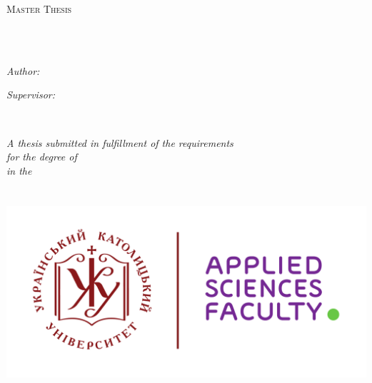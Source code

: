 \documentclass[
    11pt,
    english,
    singlespacing,
    headsepline,
    openany,
]{MastersThesis}
\author{Oleksandr \textsc{Onbysh}}
\begin{document}
\frontmatter 
\pagestyle{plain} 


\begin{titlepage}
\begin{center}

\vspace*{.06\textheight}
{\scshape\LARGE \univname\par}\vspace{1.5cm} %
\textsc{\Large Master Thesis}\\[0.5cm] %

\HRule \\[0.4cm] %
{\huge \bfseries \ttitle\par}\vspace{0.4cm} %
\HRule \\[1.5cm] %
 
\begin{minipage}[t]{0.4\textwidth}
\begin{flushleft} \large
\emph{Author:}\\
\href{https://www.linkedin.com/in/alexanderonbysh/}{\authorname}
\end{flushleft}
\end{minipage}
\begin{minipage}[t]{0.4\textwidth}
\begin{flushright} \large
\emph{Supervisor:} \\
\href{https://nure.ua/en/staff/andrii-babii}{\supname}
\end{flushright}
\end{minipage}\\[3cm]
 
\vfill

\large \textit{A thesis submitted in fulfillment of the requirements\\ for the degree of \degreename}\\[0.3cm] %
\textit{in the}\\[0.4cm]
\groupname\\\deptname\\[2cm]
 
\vfill
\includegraphics[scale=0.15]{logo.png} %


\end{center}
\end{titlepage}
\end{document}
